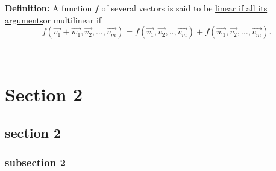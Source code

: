 \documentclass{report}
\begin{document}
\textbf{Definition:} A function $f$ of several vectors is said to be \underline{linear if all its arguments}or multilinear if 
\[
f \left( \vec{v_1} +\vec{w_1} , \vec{v_2} ,\ldots, \vec{v_m}  \right) = f \left( \vec{v_1} ,\vec{v_2} ,..,\vec{v_m}  \right) +f \left( \vec{w_1} ,\vec{v_2} ,\ldots,\vec{v_m}  \right) 
.\] 

\\
\chapter{Section 2}
\section{section 2}
\subsection{subsection 2}
\end{document}
